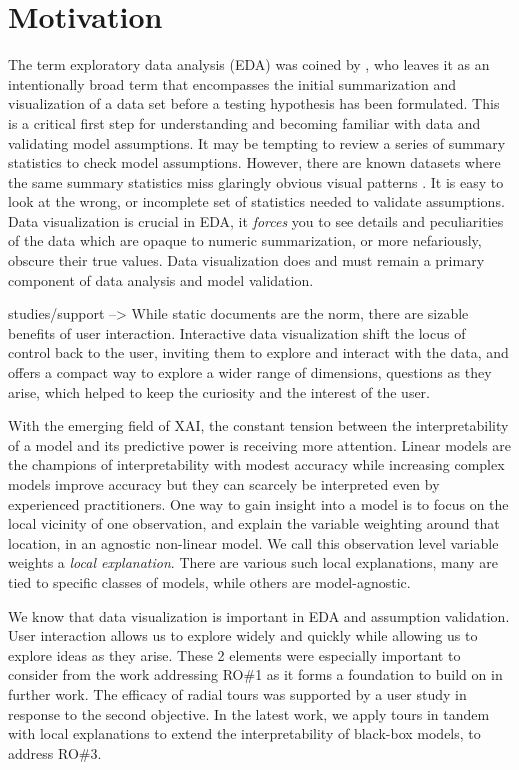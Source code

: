 \documentclass{template/monashthesis}
\begin{document}
\hypertarget{motivation}{%
\section{Motivation}\label{motivation}}

The term exploratory data analysis (EDA) was coined by \textcite{tukey_exploratory_1977}, who leaves it as an intentionally broad term that encompasses the initial summarization and visualization of a data set before a testing hypothesis has been formulated. This is a critical first step for understanding and becoming familiar with data and validating model assumptions. It may be tempting to review a series of summary statistics to check model assumptions. However, there are known datasets where the same summary statistics miss glaringly obvious visual patterns \autocite{anscombe_graphs_1973,matejka_same_2017}. It is easy to look at the wrong, or incomplete set of statistics needed to validate assumptions. Data visualization is crucial in EDA, it \emph{forces} you to see details and peculiarities of the data which are opaque to numeric summarization, or more nefariously, obscure their true values. Data visualization does and must remain a primary component of data analysis and model validation.

studies/support --\textgreater{}
While static documents are the norm, there are sizable benefits of user interaction. Interactive data visualization shift the locus of control back to the user, inviting them to explore and interact with the data, and offers a compact way to explore a wider range of dimensions, questions as they arise, which helped to keep the curiosity and the interest of the user.

With the emerging field of XAI, the constant tension between the interpretability of a model and its predictive power is receiving more attention. Linear models are the champions of interpretability with modest accuracy while increasing complex models improve accuracy but they can scarcely be interpreted even by experienced practitioners. One way to gain insight into a model is to focus on the local vicinity of one observation, and explain the variable weighting around that location, in an agnostic non-linear model. We call this observation level variable weights a \emph{local explanation}. There are various such local explanations, many are tied to specific classes of models, while others are model-agnostic.

We know that data visualization is important in EDA and assumption validation. User interaction allows us to explore widely and quickly while allowing us to explore ideas as they arise. These 2 elements were especially important to consider from the work addressing RO\#1 as it forms a foundation to build on in further work. The efficacy of radial tours was supported by a user study in response to the second objective. In the latest work, we apply tours in tandem with local explanations to extend the interpretability of black-box models, to address RO\#3.
\end{document}
